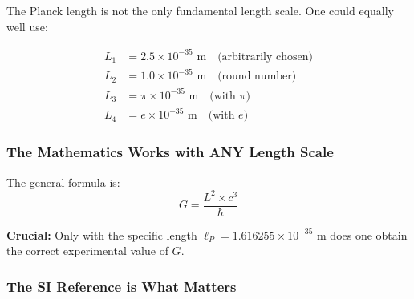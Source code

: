 	The Planck length is not the only fundamental length scale. One could equally well use:
	
	\begin{align}
		L_1 &= 2.5 \times 10^{-35} \text{ m} \quad \text{(arbitrarily chosen)}\\
		L_2 &= 1.0 \times 10^{-35} \text{ m} \quad \text{(round number)}\\
		L_3 &= \pi \times 10^{-35} \text{ m} \quad \text{(with } \pi \text{)}\\
		L_4 &= e \times 10^{-35} \text{ m} \quad \text{(with } e \text{)}
	\end{align}
	
	\subsubsection{The Mathematics Works with ANY Length Scale}
	
	The general formula is:
	\begin{equation}
		G = \frac{L^2 \times c^3}{\hbar}
	\end{equation}
	
	\textbf{Crucial:} Only with the specific length $\ell_P = 1.616255 \times 10^{-35}$ m does one obtain the correct experimental value of $G$.
	
	\subsubsection{The SI Reference is What Matters}
	
	\begin{table}[h]
		\centering
		\caption{G-values for different length scales}
	\end{table}
	
